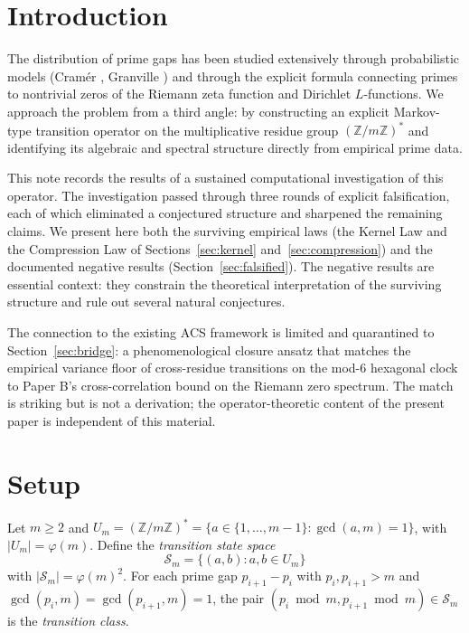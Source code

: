 \documentclass[11pt,a4paper]{article}
\begin{document}
\section{Introduction}
\label{sec:intro}

The distribution of prime gaps has been studied extensively through probabilistic models (Cram\'{e}r \cite{Cramer}, Granville \cite{Granville}) and through the explicit formula connecting primes to nontrivial zeros of the Riemann zeta function and Dirichlet $L$-functions. We approach the problem from a third angle: by constructing an explicit Markov-type transition operator on the multiplicative residue group $(\mathbb{Z}/m\mathbb{Z})^*$ and identifying its algebraic and spectral structure directly from empirical prime data.

This note records the results of a sustained computational investigation of this operator. The investigation passed through three rounds of explicit falsification, each of which eliminated a conjectured structure and sharpened the remaining claims. We present here both the surviving empirical laws (the Kernel Law and the Compression Law of Sections~\ref{sec:kernel} and~\ref{sec:compression}) and the documented negative results (Section~\ref{sec:falsified}). The negative results are essential context: they constrain the theoretical interpretation of the surviving structure and rule out several natural conjectures.

The connection to the existing ACS framework \cite{Wallace2026a, WallaceB, WallaceC} is limited and quarantined to Section~\ref{sec:bridge}: a phenomenological closure ansatz that matches the empirical variance floor of cross-residue transitions on the mod-6 hexagonal clock to Paper B's cross-correlation bound on the Riemann zero spectrum. The match is striking but is not a derivation; the operator-theoretic content of the present paper is independent of this material.

\section{Setup}
\label{sec:setup}

Let $m \geq 2$ and $U_m = (\mathbb{Z}/m\mathbb{Z})^* = \{a \in \{1, \ldots, m-1\} : \gcd(a, m) = 1\}$, with $|U_m| = \varphi(m)$. Define the \emph{transition state space}
\begin{equation}
\mathcal{S}_m = \{(a, b) : a, b \in U_m\}
\end{equation}
with $|\mathcal{S}_m| = \varphi(m)^2$. For each prime gap $p_{i+1} - p_i$ with $p_i, p_{i+1} > m$ and $\gcd(p_i, m) = \gcd(p_{i+1}, m) = 1$, the pair $(p_i \bmod m, p_{i+1} \bmod m) \in \mathcal{S}_m$ is the \emph{transition class}.
\end{document}
